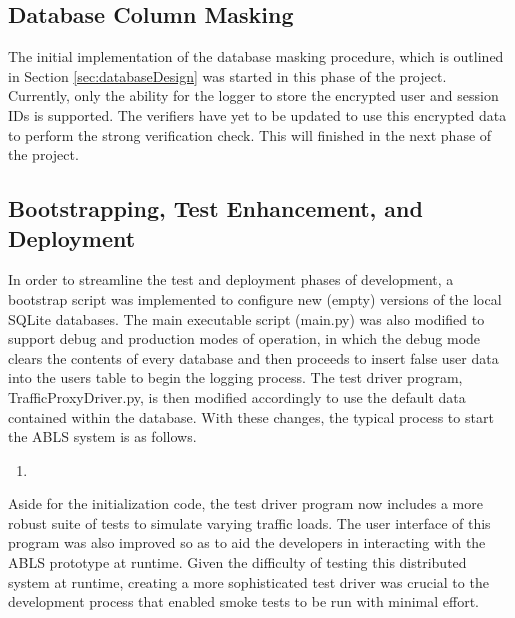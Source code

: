 \documentclass{sig-alternate}
\begin{document}

\subsection{Database Column Masking}
The initial implementation of the database masking procedure, which is outlined in Section \ref{sec:databaseDesign}
was started in this phase of the project. Currently, only the ability for the logger to store the encrypted user and session IDs 
is supported. The verifiers have yet to be updated to use this encrypted data to perform the strong verification check. This 
will finished in the next phase of the project.

\subsection{Bootstrapping, Test Enhancement, and Deployment}
In order to streamline the test and deployment phases of development, a bootstrap script was implemented to configure
new (empty) versions of the local SQLite databases. The main executable script (main.py) was also modified to support
debug and production modes of operation, in which the debug mode clears the contents of every database and
then proceeds to insert false user data into the users table to begin the logging process. The test driver program,
TrafficProxyDriver.py, is then modified accordingly to use the default data contained within the database. With these
changes, the typical process to start the ABLS system is as follows.

\begin{enumerate}
	\item 
\end{enumerate}

Aside for the initialization code, the test driver program now includes a more robust suite of tests to simulate varying traffic 
loads. The user interface of this program was also improved so as to aid the developers in interacting with the ABLS 
prototype at runtime. Given the difficulty of testing this distributed system at runtime, creating a more sophisticated
test driver was crucial to the development process that enabled smoke tests to be run with minimal effort.
\end{document}
